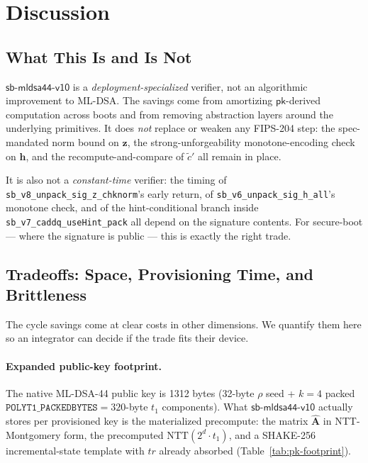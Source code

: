 \documentclass[11pt,a4paper]{article}
\newcommand{\NTT}{\mathrm{NTT}}
\begin{document}
\section{Discussion}
\label{sec:discussion}

\subsection{What This Is and Is Not}

$\textsf{sb-mldsa44-v10}$ is a \emph{deployment-specialized} verifier, not
an algorithmic improvement to ML-DSA. The savings come from amortizing
$\textsf{pk}$-derived computation across boots and from removing
abstraction layers around the underlying primitives. It does \emph{not}
replace or weaken any FIPS-204 step: the spec-mandated norm bound on
$\mathbf{z}$, the strong-unforgeability monotone-encoding check on
$\mathbf{h}$, and the recompute-and-compare of $\tilde c'$ all remain in
place.

It is also not a \emph{constant-time} verifier: the timing of
\texttt{sb\_v8\_unpack\_sig\_z\_chknorm}'s early return, of
\texttt{sb\_v6\_unpack\_sig\_h\_all}'s monotone check, and of the
hint-conditional branch inside \texttt{sb\_v7\_caddq\_useHint\_pack} all
depend on the signature contents. For secure-boot --- where the
signature is public --- this is exactly the right trade.

\subsection{Tradeoffs: Space, Provisioning Time, and Brittleness}
\label{sec:tradeoffs}

The cycle savings come at clear costs in other dimensions. We
quantify them here so an integrator can decide if the trade fits
their device.

\paragraph{Expanded public-key footprint.} The native ML-DSA-44 public
key is 1312 bytes (32-byte $\rho$ seed + $k = 4$ packed
$\texttt{POLYT1\_PACKEDBYTES} = 320$-byte $t_1$ components). What
$\textsf{sb-mldsa44-v10}$ actually stores per provisioned key is the
materialized precompute: the matrix $\hat{\mathbf{A}}$ in
NTT-Montgomery form, the precomputed $\NTT(2^d \cdot t_1)$, and a
SHAKE-256 incremental-state template with $tr$ already absorbed
(Table~\ref{tab:pk-footprint}).
\end{document}
